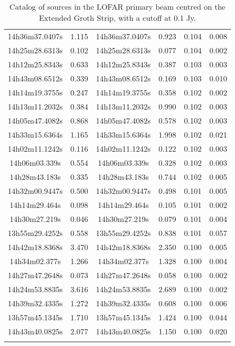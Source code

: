 \begin{longtable}{cccccc}
14h36m37.0407s & 1.115 & 14h36m37.0407s & 0.923 & 0.104 & 0.008 \\
14h25m28.6313s & 0.102 & 14h25m28.6313s & 0.077 & 0.104 & 0.002 \\
14h12m25.8343s & 0.633 & 14h12m25.8343s & 0.387 & 0.103 & 0.003 \\
14h43m08.6512s & 0.339 & 14h43m08.6512s & 0.169 & 0.103 & 0.010 \\
14h14m19.3755s & 0.247 & 14h14m19.3755s & 0.358 & 0.102 & 0.002 \\
14h13m11.2032s & 0.384 & 14h13m11.2032s & 0.990 & 0.102 & 0.003 \\
14h05m47.4082s & 0.868 & 14h05m47.4082s & 0.578 & 0.102 & 0.003 \\
14h33m15.6364s & 1.165 & 14h33m15.6364s & 1.998 & 0.102 & 0.021 \\
14h02m11.1242s & 0.116 & 14h02m11.1242s & 0.122 & 0.102 & 0.003 \\
14h06m03.339s & 0.554 & 14h06m03.339s & 0.328 & 0.102 & 0.003 \\
14h28m43.183s & 0.335 & 14h28m43.183s & 0.744 & 0.102 & 0.005 \\
14h32m00.9447s & 0.500 & 14h32m00.9447s & 0.498 & 0.101 & 0.005 \\
14h14m29.464s & 0.098 & 14h14m29.464s & 0.105 & 0.101 & 0.002 \\
14h30m27.219s & 0.046 & 14h30m27.219s & 0.079 & 0.101 & 0.004 \\
13h55m29.4252s & 0.558 & 13h55m29.4252s & 0.838 & 0.101 & 0.057 \\
14h42m18.8368s & 3.470 & 14h42m18.8368s & 2.350 & 0.100 & 0.005 \\
14h34m02.377s & 1.266 & 14h34m02.377s & 1.328 & 0.100 & 0.004 \\
14h27m47.2648s & 0.073 & 14h27m47.2648s & 0.058 & 0.100 & 0.002 \\
14h24m53.8835s & 3.616 & 14h24m53.8835s & 2.689 & 0.100 & 0.002 \\
14h39m32.4335s & 1.272 & 14h39m32.4335s & 0.608 & 0.100 & 0.006 \\
13h57m45.1345s & 1.710 & 13h57m45.1345s & 1.424 & 0.100 & 0.044 \\
14h43m40.0825s & 2.077 & 14h43m40.0825s & 1.150 & 0.100 & 0.020 \\
\caption{\label{widefield.survey.catalog} Catalog of sources in the LOFAR primary beam centred on the Extended Groth Strip, with a cutoff at 0.1 Jy.}
\end{longtable}
